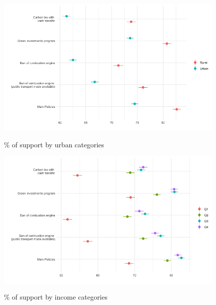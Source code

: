 \begin{frame}{}%
\begin{figure}[h!]
\caption{\% of support by urban categories} %
\includegraphics[width=.7\paperwidth]{../figures/country_comparison/main_support_var_by_treatment_urban_all.png} \\
\end{figure}
\end{frame}

\begin{frame}{}%
\begin{figure}[h!]
\caption{\% of support by income categories} %
\includegraphics[width=.7\paperwidth]{../figures/country_comparison/main_support_var_by_treatment_income_all.png} \\
\end{figure}
\end{frame}

